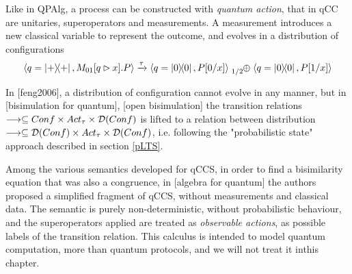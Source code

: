 Like in QPAlg, a process can be constructed with \textit{quantum action}, that in qCC  are unitaries, superoperators and measurements. A measurement introduces a new classical variable to represent the outcome, and evolves in a distribution of configurations
\[ \confw{q = \proj{+}, M_{01}[q \rhd x].P} \xrightarrow{\tau} \confw{q = \proj{0}, P[0/x]} \psum{1/2} \confw{q = \proj{0}, P[1/x]} 
\]

In [feng2006], a distribution of configuration cannot evolve in any manner, but in [bisimulation for quantum], [open bisimulation] the transition relations $\longrightarrow \subseteq Conf \times Act_\tau \times \mathcal{D}(Conf)$ is lifted to a relation between distribution $\longrightarrow \subseteq \mathcal{D}(Conf) \times Act_\tau \times \mathcal{D}(Conf)$, i.e. following the "probabilistic state" approach described in section \ref{pLTS}.


Among the various semantics developed for qCCS, in order to find a bisimilarity equation that was also a congruence, in [algebra for quantum] the authors proposed a simplified fragment of qCCS, without measurements and classical data. The semantic is purely non-deterministic, without probabilistic behaviour, and the superoperators applied are treated as \textit{observable actions}, as possible labels of the transition relation. This calculus is intended to model quantum computation, more than quantum protocols, and we will not treat it inthis chapter.


